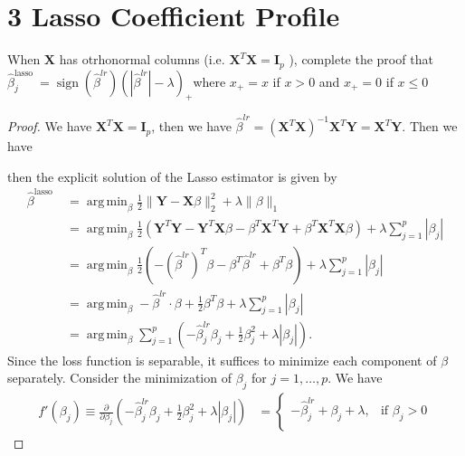 \documentclass[10pt]{article}
\DeclareMathOperator*{\argmin}{arg\,min}
\begin{document}
\section*{3 Lasso Coefficient Profile}
When $\mathbf{X}$ has otrhonormal columns (i.e. $\mathbf{X}^{T} \mathbf{X}=\mathbf{I}_{p}$ ), complete the proof that $\hat{\beta}_{j}^{\text {lasso }}=\operatorname{sign}\left(\hat{\beta}^{l r}\right)\left(\left|\hat{\beta}^{l r}\right|-\lambda\right)_{+}$where $x_{+}=x$ if $x>0$ and $x_{+}=0$ if $x \leq 0$
\begin{proof}
    We have $\mathbf{X}^{T}\mathbf{X} = \mathbf{I}_{p}$, then we have $\hat\beta^{lr}= (\mathbf{X}^{T}\mathbf{X})^{-1}\mathbf{X}^{T}\mathbf{Y} = \mathbf{X}^{T}\mathbf{Y}$. Then we have
    
    then the explicit solution of the Lasso estimator is given by
    \begin{align*}
        \hat{\beta}^{\text {lasso }} &= \argmin_{\beta} \frac{1}{2}\|\mathbf{Y}-\mathbf{X}\beta\|_{2}^{2}+\lambda\|\beta\|_{1}\\
        &= \argmin_{\beta} \frac{1}{2}\left(\mathbf{Y}^{T}\mathbf{Y}-\mathbf{Y}^{T}\mathbf{X}\beta-\beta^{T}\mathbf{X}^{T}\mathbf{Y}+\beta^{T}\mathbf{X}^{T}\mathbf{X}\beta\right)+\lambda\sum_{j=1}^{p}|\beta_{j}|\\
        &= \argmin_{\beta} \frac{1}{2}\left(-(\hat\beta^{lr})^T \beta- \beta^{T}\hat\beta^{lr}+\beta^{T}\beta\right)+\lambda\sum_{j=1}^{p}|\beta_{j}|\\
        &= \argmin_{\beta} -\hat{\beta}^{lr} \cdot \beta+\frac{1}{2}\beta^{T}\beta+\lambda\sum_{j=1}^{p}|\beta_{j}|\\
        &= \argmin_{\beta} \sum_{j=1}^{p}\left(-\hat{\beta}^{lr}_j \beta_j + \frac{1}{2}\beta_j^2+\lambda|\beta_j|\right).
    \end{align*}
    Since the loss function is separable, it suffices to minimize each component of $\beta$ separately. Consider the minimization of $\beta_j$ for $j=1,\ldots,p$. We have \begin{align*}
        f'(\beta_j)\equiv \frac{\partial}{\partial \beta_j} \left(-\hat{\beta}^{lr}_j \beta_j + \frac{1}{2}\beta_j^2+\lambda|\beta_j|\right) &= \begin{cases}
            -\hat{\beta}^{lr}_j + \beta_j + \lambda, & \text{if } \beta_j > 0\\

\end{cases}
\end{align*}
\end{proof}
\end{document}
